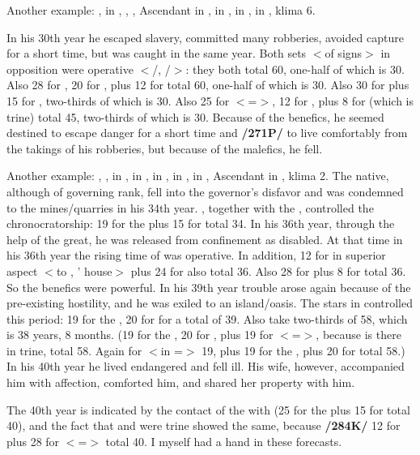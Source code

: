 Another example: \Sun, \Mercury\xspace in \Capricorn, \Moon, \Mars, Ascendant in \Taurus, \Saturn\xspace in \Scorpio, \Jupiter\xspace in \Cancer, \Venus\xspace in \Pisces, klima 6. 

In his 30th year he escaped slavery, committed many robberies, avoided capture for a short time, but was caught in the same year. Both sets $<$of signs$>$ in opposition were operative $<$\Taurus/\Scorpio, \Cancer/\Capricorn$>$: they both total 60, one-half of which is 30. Also 28 for \Capricorn, 20 for \Mercury, plus 12 for \Jupiter\xspace total 60, one-half of which is 30. Also 30 for \Saturn\xspace plus 15 for \Mars, two-thirds of which is 30. Also 25 for \Cancer\xspace $<$=\Moon$>$, 12 for \Jupiter, plus
8 for \Venus\xspace (which is trine) total 45, two-thirds of which is 30. Because of the benefics, he seemed destined to escape danger for a short time and \textbf{/271P/} to live comfortably from the takings of his robberies, but because of the malefics, he fell.

Another example: \Sun, \Saturn, \Mercury\xspace in \Sagittarius, \Moon\xspace in \Cancer, \Jupiter\xspace in \Taurus, \Mars\xspace in
\Leo, \Venus\xspace in \Capricorn, Ascendant in \Virgo, klima 2. The native, although of governing rank, fell into the governor’s disfavor and was condemned to the mines/quarries in his 34th year. \Mars, together with the \Sun, controlled the chronocratorship: 19 for the \Sun\xspace plus 15 for \Mars\xspace total 34. In his 36th year, through the help of the great, he was released from confinement as disabled. At that time in his 36th year the rising time of \Leo\xspace was operative. In addition, 12 for \Jupiter\xspace in superior aspect $<$to \Scorpio, \Mars’ house$>$ plus 24 for \Taurus also total 36. Also 28 for \Capricorn\xspace plus 8 for \Venus\xspace total 36. So the benefics were powerful. In his 39th year trouble arose again because of the pre-existing hostility, and he was exiled to an
island/oasis. The stars in \Sagittarius\xspace controlled this period: 19 for the \Sun, 20 for \Mercury\xspace for a total of 39. Also take two-thirds of 58, which is 38 years, 8 months. (19 for the \Sun, 20 for \Mercury, plus 19 for \Leo $<$=\Sun$>$, because \Mars\xspace is there in trine, total 58. Again for \Mars\xspace $<$in \Leo=\Sun$>$ 19, plus 19 for the \Sun, plus 20 for \Mercury total 58.) In his 40th year he lived endangered and fell ill. His wife, however, accompanied him with affection, comforted him, and shared her property with him. 

The 40th year is indicated by the contact of the \Moon\xspace with \Mars\xspace (25 for the \Moon\xspace plus 15 for \Mars\xspace total 40), and the fact that \Jupiter\xspace and \Venus\xspace were trine showed the same, because \textbf{/284K/} 12 for \Jupiter\xspace plus 28 for \Venus\xspace $<$=\Capricorn$>$ total 40. I myself had a hand in these forecasts.

